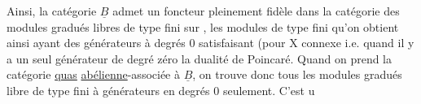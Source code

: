Ainsi, la catégorie $\underline{B}$ admet un foncteur pleinement fidèle dans la
catégorie des modules gradués libres de type fini sur \handwritten{$\Lambda$}, les modules
de type fini qu'on obtient ainsi ayant des générateurs à degrés \handwritten{$<$} 0
satisfaisant (pour X connexe i.e. quand il y a un seul générateur de
degré zéro\handwritten{)} la dualité de Poincaré. Quand on prend la catégorie \uline{quas}
\uline{abélienne}-associée à $\underline{B}$, on trouve donc tous les modules gradués libre
de type fini à générateurs  en degrés \handwritten{$\leqslant$} 0 seulement. C'est u



